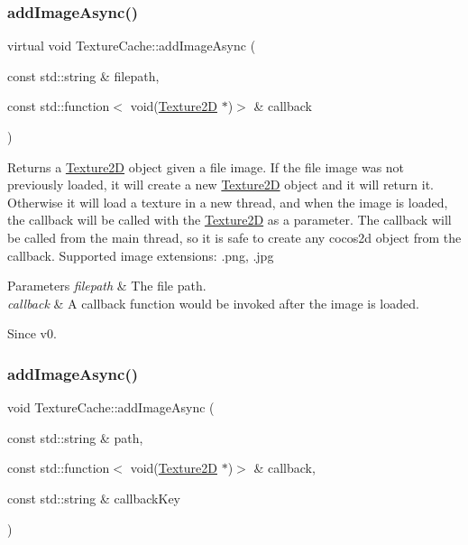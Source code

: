 \subsubsection{\texorpdfstring{add\+Image\+Async()}{addImageAsync()}\hspace{0.1cm}{\footnotesize\ttfamily [2/3]}}
{\footnotesize\ttfamily virtual void Texture\+Cache\+::add\+Image\+Async (\begin{DoxyParamCaption}\item[{const std\+::string \&}]{filepath,  }\item[{const std\+::function$<$ void(\hyperlink{classTexture2D}{Texture2D} $\ast$)$>$ \&}]{callback }\end{DoxyParamCaption})\hspace{0.3cm}{\ttfamily [virtual]}}

Returns a \hyperlink{classTexture2D}{Texture2D} object given a file image. If the file image was not previously loaded, it will create a new \hyperlink{classTexture2D}{Texture2D} object and it will return it. Otherwise it will load a texture in a new thread, and when the image is loaded, the callback will be called with the \hyperlink{classTexture2D}{Texture2D} as a parameter. The callback will be called from the main thread, so it is safe to create any cocos2d object from the callback. Supported image extensions\+: .png, .jpg 
\begin{DoxyParams}{Parameters}
{\em filepath} & The file path. \\
\hline
{\em callback} & A callback function would be invoked after the image is loaded. \\
\hline
\end{DoxyParams}
\begin{DoxySince}{Since}
v0. 
\end{DoxySince}
\mbox{\label{classTextureCache_af36a764b691191f78fb76cc20aa8c80d}} 
\subsubsection{\texorpdfstring{add\+Image\+Async()}{addImageAsync()}\hspace{0.1cm}{\footnotesize\ttfamily [3/3]}}
{\footnotesize\ttfamily void Texture\+Cache\+::add\+Image\+Async (\begin{DoxyParamCaption}\item[{const std\+::string \&}]{path,  }\item[{const std\+::function$<$ void(\hyperlink{classTexture2D}{Texture2D} $\ast$)$>$ \&}]{callback,  }\item[{const std\+::string \&}]{callback\+Key }\end{DoxyParamCaption})}

